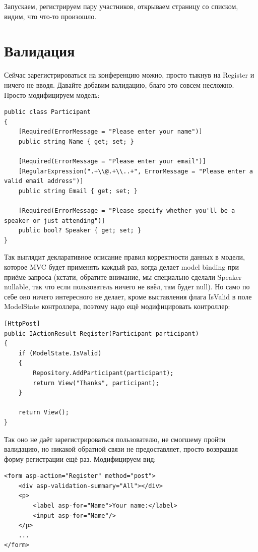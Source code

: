 \documentclass[a5paper]{article}
\begin{document}
Запускаем, регистрируем пару участников, открываем страницу со списком, видим, что что-то произошло.

\section{Валидация}

Сейчас зарегистрироваться на конференцию можно, просто тыкнув на Register и ничего не вводя. Давайте добавим валидацию, благо это совсем несложно. Просто модифицируем модель:

\begin{verbatim}
public class Participant
{
    [Required(ErrorMessage = "Please enter your name")]
    public string Name { get; set; }

    [Required(ErrorMessage = "Please enter your email")]
    [RegularExpression(".+\\@.+\\..+", ErrorMessage = "Please enter a valid email address")]
    public string Email { get; set; }

    [Required(ErrorMessage = "Please specify whether you'll be a speaker or just attending")]
    public bool? Speaker { get; set; }
}
\end{verbatim}

Так выглядит декларативное описание правил корректности данных в модели, которое MVC будет применять каждый раз, когда делает model binding при приёме запроса (кстати, обратите внимание, мы специально сделали Speaker nullable, так что если пользователь ничего не ввёл, там будет null). 
Но само по себе оно ничего интересного не делает, кроме выставления флага IsValid в поле ModelState контроллера, поэтому надо ещё модифицировать контроллер:

\begin{verbatim}
[HttpPost]
public IActionResult Register(Participant participant)
{
    if (ModelState.IsValid)
    {
        Repository.AddParticipant(participant);
        return View("Thanks", participant);
    }

    return View();
}
\end{verbatim}

Так оно не даёт зарегистрироваться пользователю, не смогшему пройти валидацию, но никакой обратной связи не предоставляет, просто возвращая форму регистрации ещё раз. Модифицируем вид:

\begin{verbatim}
<form asp-action="Register" method="post">
    <div asp-validation-summary="All"></div>
    <p>
        <label asp-for="Name">Your name:</label>
        <input asp-for="Name"/>
    </p>
    ...
</form>
\end{verbatim}
\end{document}
